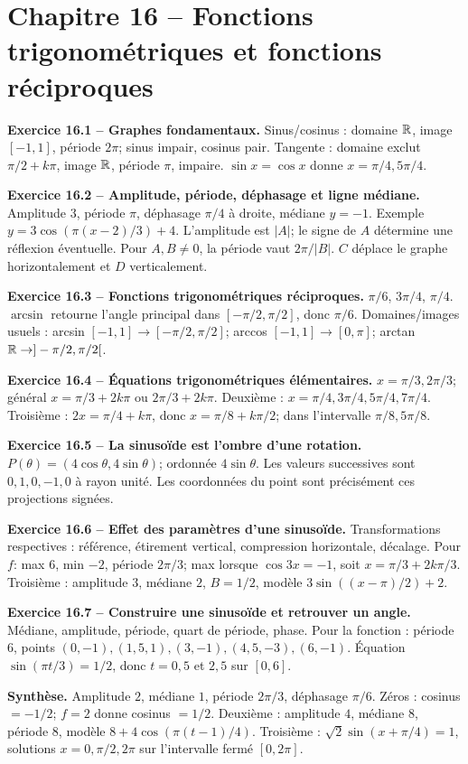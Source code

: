 \chapter*{Chapitre 16 -- Fonctions trigonométriques et fonctions réciproques}
\begin{answerbox}
\textbf{Exercice 16.1 -- Graphes fondamentaux.} Sinus/cosinus : domaine $\mathbb{R}$, image $[-1,1]$, période $2\pi$; sinus impair, cosinus pair. Tangente : domaine exclut $\pi/2+k\pi$, image $\mathbb{R}$, période $\pi$, impaire. $\sin x=\cos x$ donne $x=\pi/4,5\pi/4$.\par
\textbf{Exercice 16.2 -- Amplitude, période, déphasage et ligne médiane.} Amplitude $3$, période $\pi$, déphasage $\pi/4$ à droite, médiane $y=-1$. Exemple $y=3\cos(\pi(x-2)/3)+4$. L'amplitude est $|A|$; le signe de $A$ détermine une réflexion éventuelle. Pour $A,B\ne0$, la période vaut $2\pi/|B|$. $C$ déplace le graphe horizontalement et $D$ verticalement.\par
\textbf{Exercice 16.3 -- Fonctions trigonométriques réciproques.} $\pi/6$, $3\pi/4$, $\pi/4$. $\arcsin$ retourne l'angle principal dans $[-\pi/2,\pi/2]$, donc $\pi/6$. Domaines/images usuels : arcsin $[-1,1]\to[-\pi/2,\pi/2]$; arccos $[-1,1]\to[0,\pi]$; arctan $\mathbb{R}\to]-\pi/2,\pi/2[$.\par
\textbf{Exercice 16.4 -- Équations trigonométriques élémentaires.} $x=\pi/3,2\pi/3$; général $x=\pi/3+2k\pi$ ou $2\pi/3+2k\pi$. Deuxième : $x=\pi/4,3\pi/4,5\pi/4,7\pi/4$. Troisième : $2x=\pi/4+k\pi$, donc $x=\pi/8+k\pi/2$; dans l'intervalle $\pi/8,5\pi/8$.\par
\textbf{Exercice 16.5 -- La sinusoïde est l'ombre d'une rotation.} $P(\theta)=(4\cos\theta,4\sin\theta)$; ordonnée $4\sin\theta$. Les valeurs successives sont $0,1,0,-1,0$ à rayon unité. Les coordonnées du point sont précisément ces projections signées.\par
\textbf{Exercice 16.6 -- Effet des paramètres d'une sinusoïde.} Transformations respectives : référence, étirement vertical, compression horizontale, décalage. Pour $f$: max $6$, min $-2$, période $2\pi/3$; max lorsque $\cos3x=-1$, soit $x=\pi/3+2k\pi/3$. Troisième : amplitude $3$, médiane $2$, $B=1/2$, modèle $3\sin((x-\pi)/2)+2$.\par
\textbf{Exercice 16.7 -- Construire une sinusoïde et retrouver un angle.} Médiane, amplitude, période, quart de période, phase. Pour la fonction : période $6$, points $(0,-1),(1{,}5,1),(3,-1),(4{,}5,-3),(6,-1)$. Équation $\sin(\pi t/3)=1/2$, donc $t=0{,}5$ et $2{,}5$ sur $[0,6]$.\par
\medskip\textbf{Synthèse.} Amplitude $2$, médiane $1$, période $2\pi/3$, déphasage $\pi/6$. Zéros : cosinus $=-1/2$; $f=2$ donne cosinus $=1/2$. Deuxième : amplitude $4$, médiane $8$, période $8$, modèle $8+4\cos(\pi(t-1)/4)$. Troisième : $\sqrt2\sin(x+\pi/4)=1$, solutions $x=0,\pi/2,2\pi$ sur l'intervalle fermé $[0,2\pi]$.
\end{answerbox}
